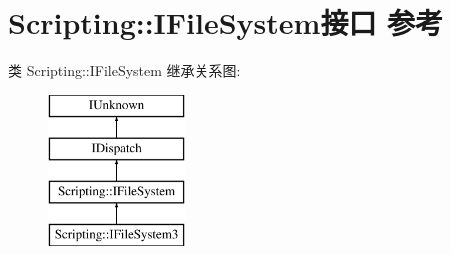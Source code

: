 \hypertarget{interface_scripting_1_1_i_file_system}{}\section{Scripting\+:\+:I\+File\+System接口 参考}
\label{interface_scripting_1_1_i_file_system}
类 Scripting\+:\+:I\+File\+System 继承关系图\+:\begin{figure}[H]
\begin{center}
\leavevmode
\includegraphics[height=4.000000cm]{interface_scripting_1_1_i_file_system}
\end{center}
\end{figure}
